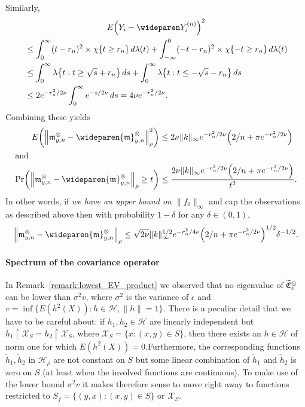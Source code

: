 \documentclass[AHL,Unicode,longabstracts,published]{cedram}
\theoremstyle{remark}
\newcommand{\restrr}
{\!\!\upharpoonright\!\!}
\newcommand{\X}{\mathcal{X}}
\newcommand{\cH}{\mathcal{H}}
\newcommand{\fkC}{\mathfrak{C}}
\newcommand{\mean}{\mathfrak{m}}
\let\oldtilde\tilde
\renewcommand*{\tilde}[1]{\mathchoice{\widetilde{#1}}{\widetilde{#1}}{\oldtilde{#1}}{\oldtilde{#1}}}
\let\originalleft\left
\let\originalright\right
\renewcommand{\left}{\mathopen{}\mathclose\bgroup\originalleft}
\renewcommand{\right}{\aftergroup\egroup\originalright}
\begin{document}
Similarly,
\begin{multline}\label{eq:cappedYVar}
E\left(Y_i - \wideparen Y^{(n)}_i\right)^2\\
\begin{aligned}
 &\leq \int_0^\infty (t-r_n)^2 \times \chi\{t \geq r_n \} \, d\lambda(t) + \int_{-\infty}^0 (-t-r_n)^2 \times \chi\{ - t \geq r_n \} \, d\lambda(t)  \\
&\leq \int_0^\infty \lambda\left\{ t : t \geq \sqrt{s} + r_n\right\} \, ds + \int_0^\infty \lambda\left\{t : t \leq - \sqrt{s} - r_n \right\} \, ds  \\
&\leq 2 e^{-r_n^2/2\nu} \int_{0}^\infty e^{-s/2\nu} \, ds = 4 \nu e^{-r_n^2/2 \nu}. 
\end{aligned}
\end{multline}
Combining these yields
\begin{align*}
E\left(\left\|\mean_{y,n}^{\otimes} - \wideparen{\mean}_{y,n}^\otimes \right\|^2_{\rho}\right) &\leq 2 \nu \|k\|_\infty e^{-r_n^2/2 \nu} \Bigl(2/n + \pi e^{-r_n^2/2 \nu} \Bigr)
\\
\intertext{and}
\Pr\left(\left\|\mean_{y,n}^{\otimes} - \wideparen{\mean}_{y,n}^\otimes \right\|_{\rho} \geq t\right) &\leq \frac{2 \nu \|k\|_\infty e^{-r_n^2/2 \nu} \Bigl(2/n + \pi e^{-r_n^2/2 \nu} \Bigr) }{t^2}.
\end{align*}
In other words, if \emph{we have an upper bound on $\|f_0\|_\infty$} and cap the observations as described above then with probability $1- \delta$ for any $\delta \in (0,1)$,
\begin{equation}\label{eq:mean_capped}
\left\|\mean_{y,n}^{\otimes} - \wideparen{\mean}_{y,n}^\otimes \right\|_{\rho} \leq \sqrt{2 \nu} \|k\|^{1/2}_\infty e^{-r_n^2/4 \nu} \Bigl(2/n + \pi e^{-r_n^2/2 \nu} \Bigr)^{1/2}
\delta^{-1/2}.
\end{equation}

\paragraph{Spectrum of the covariance operator} 
In Remark~\ref{remark:lowest_EV_product} we observed that no eigenvalue of $\tilde{\fkC}^{\otimes}_c$ can be lower than $\sigma^2v$, where $\sigma^2$ is the variance of $\epsilon$ and $v = \inf \{ E(h^2(X)) : h \in \cH, \|h \|=1\}$. There is a peculiar detail that we have to be careful about: if $h_1, h_2 \in \cH$ are linearly independent but $h_1\restrr \X_S = h_2\restrr \X_S$, where $\X_S = \{x : (x,y) \in S\}$, then there exists an $h \in \cH$ of norm one for which $E(h^2(X)) = 0$.\linebreak Furthermore, the corresponding functions $\check h_1, \check h_2$ in $\cH_\rho$ are not constant on $S$ but some linear combination of $\check h_1$ and $\check h_2$ is zero on $S$ (at least when the involved functions are continuous). To make use of the lower bound $\sigma^2 v$ it makes therefore sense to move right away to functions restricted to $S_f = \{(y,x) : (x,y) \in S\}$ or $\X_S$.
\end{document}
